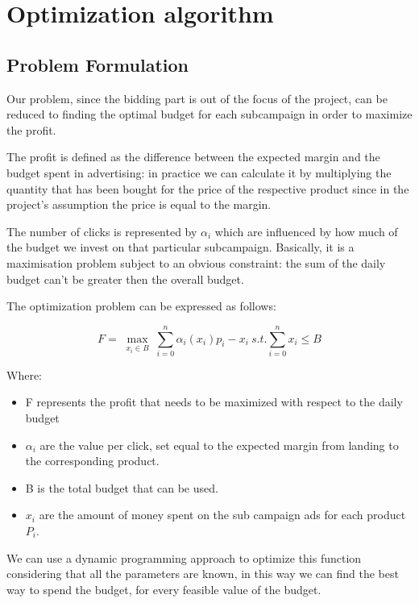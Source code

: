 \chapter{Optimization algorithm}
\label{chap:opt_alg}

\section{Problem Formulation}
\label{sec:Opt_Problem Formulation}
Our problem, since the bidding part is out of the focus of the project, can be reduced to finding the optimal budget for each subcampaign in order to maximize the profit.

The profit is defined as the difference between the expected margin and the budget spent in advertising: in practice we can calculate it by multiplying the quantity that has been bought for the price of the respective product since in the project's assumption the price is equal to the margin.

The number of clicks is represented by $\alpha_i$ which are influenced by how much of the budget we invest on that particular subcampaign.
Basically, it is a maximisation problem subject to an obvious constraint: the sum of the daily budget can't be greater then the overall budget.

The optimization problem can be expressed as follows:

\begin{displaymath}
F=\max_{\substack{x_i \in B}} \sum_{i=0}^n \alpha_i(x_i)p_i-x_i \ s.t. \sum_{i=0}^n x_i\leq B
\end{displaymath}

Where:

\begin{itemize}
    \item F represents the profit that needs to be maximized with respect to the daily budget
    \item $\alpha_i$ are the value per click, set equal to the expected margin from landing to the corresponding product.
    \item B is the total budget that can be used.
    \item $x_i$ are the amount of money spent on the sub campaign ads for each product $P_i$.
\end{itemize}

We can use a dynamic programming approach to optimize this function considering that all the parameters are known, in this way we can find the best way to spend the budget, for every feasible value of the budget.

